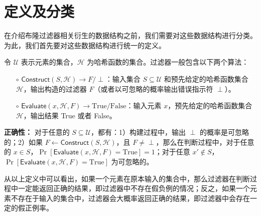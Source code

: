 
\section{定义及分类}

在介绍布隆过滤器相关衍生的数据结构之前，我们需要对这些数据结构进行分类。
为此，我们首先要对这些数据结构进行统一的定义。

\begin{definition}[过滤器]\label{def:filter}
    令 $\mathcal{U}$ 表示元素的集合，$\mathcal{H}$ 为哈希函数的集合。过滤器一般包含以下两个算法：
    \begin{itemize}
    \item[$\circ$] $\mathsf{Construct}(S, \mathcal{H}) \to F/\perp$：输入集合 $S \subseteq \mathcal{U}$ 和预先给定的哈希函数集合 $\mathcal{H}$，输出构造的过滤器 $F$（或者以可忽略的概率输出错误指示符 $\perp$）。
    \item[$\circ$] $\mathsf{Evaluate}(x, \mathcal{H}, F) \to \mbox{True}/\mbox{False} $：输入元素 $x$，预先给定的哈希函数集合 $\mathcal{H}$，输出结果 True 或者 False。
    \end{itemize}

    \textbf{正确性：} 对于任意的 $S \subseteq \mathcal{U}$，都有：1）构建过程中，输出 $\perp$ 的概率是可忽略的；2）如果 $F \gets \mathsf{Construct}(S, \mathcal{H})$，且 $F \neq \perp$，那么在判断过程中，对于任意的 $x \in S$，$\Pr[\mathsf{Evaluate}(x, \mathcal{H}, F) = \mbox{True}] = 1$；对于任意 $x' \notin S$，$\Pr[\mathsf{Evaluate}(x, \mathcal{H}, F) = \mbox{True}]$ 为可忽略的。
\end{definition}
从以上定义中可以看出，如果一个元素在原本输入的集合中，那么过滤器在判断过程中一定能返回正确的结果，即过滤器中不存在假负例的情况；反之，如果一个元素不存在于输入的集合中，过滤器会大概率返回正确的结果，即过滤器中会存在一定的假正例率。


